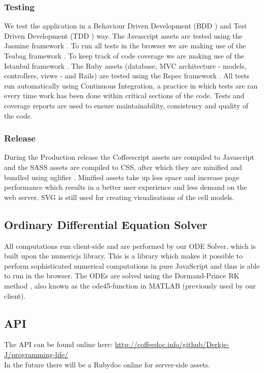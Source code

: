 \documentclass{report}
\begin{document}
			\subsubsection{Testing}
				We test the application in a Behaviour Driven Development (BDD \cite{bdd} ) and Test Driven Development (TDD \cite{tdd} ) way. 
				The Javascript assets are tested using the Jasmine framework \cite{jasmine} . 
				To run all tests in the browser we are making use of the Teabag framework \cite{teabag} . 
				To keep track of code coverage we are making use of the Istanbul framework \cite{istanbul} .
				The Ruby assets (database, MVC architecture - models, controllers, views - and Rails) are tested using the Rspec framework \cite{rspec} .  
				All tests run automatically using Continuous Integration, a practice in which tests are ran every time work has been done within critical sections of the code. 
				Tests and coverage reports are used to ensure maintainability, consistency and quality of the code.
				
			\subsubsection{Release}
				During the Production release the Coffeescript assets are compiled to Javascript \cite{javascript} and the SASS assets are compiled to CSS, after which they are minified and bundled using uglifier \cite{uglifier} . Minified assets take up less space and increase page performance which results in a better user experience and less demand on the web server. 
				SVG is still used for creating visualisations of the cell models.
		\newpage		
		
		\subsection{Ordinary Differential Equation Solver}
			All computations run client-side and are performed by our ODE Solver, which is built upon the numericjs \cite{numericjs} library. This is a library which makes it possible to perform sophisticated numerical computations in pure JavaScript and thus is able to run in the browser. The ODEs are solved using the Dormand-Prince RK method \cite{dormandprince} , also known as the ode45-function in MATLAB (previously used by our client).
			
		\subsection{API}
			The API can be found online here: \url{http://coffeedoc.info/github/Derkje-J/programming-life/} \\
			In the future there will be a Rubydoc online for server-side assets.
		\newpage
			
\end{document}
